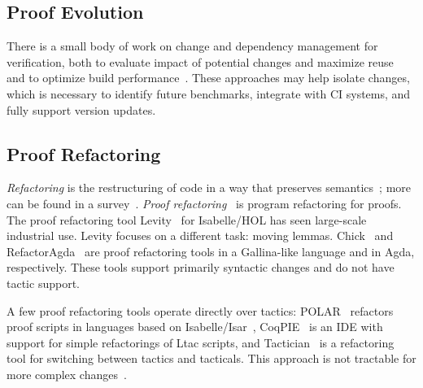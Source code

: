 \subsection*{Proof Evolution}


There is a small body of work on change and dependency management for verification,
both to evaluate impact of potential changes and maximize reuse~\cite{873647, Autexier:2010:CMH:1986659.1986663}
and to optimize build performance~\cite{Celik:2017:IRP:3155562.3155588}.
These approaches may help isolate changes, which is necessary to identify future benchmarks, integrate
with CI systems, and fully support version updates.

\subsection*{Proof Refactoring}


\textit{Refactoring} is the restructuring of code in a way that preserves semantics~\cite{opdyke1992refactoring};
more can be found in a survey~\cite{mens2004survey}.
\textit{Proof refactoring}~\cite{WhitesidePhD} is program refactoring for proofs.
The proof refactoring tool Levity~\cite{Bourke12} for Isabelle/HOL has seen large-scale industrial use.
Levity focuses on a different task: moving lemmas.
Chick~\cite{robert2018} and RefactorAgda~\cite{wibergh2019} are proof refactoring tools
in a Gallina-like language and in Agda, respectively.
These tools support primarily syntactic changes and do not have tactic support.

A few proof refactoring tools operate directly over tactics:
POLAR~\cite{Dietrich2013} refactors proof scripts in languages based on Isabelle/Isar~\cite{Wenzel2007isar},
CoqPIE~\cite{Roe2016} is an IDE with support for simple refactorings of Ltac scripts, and
Tactician~\cite{adams2015} is a refactoring tool for switching between tactics and tacticals.
This approach is not tractable for more complex changes~\cite{robert2018}.

